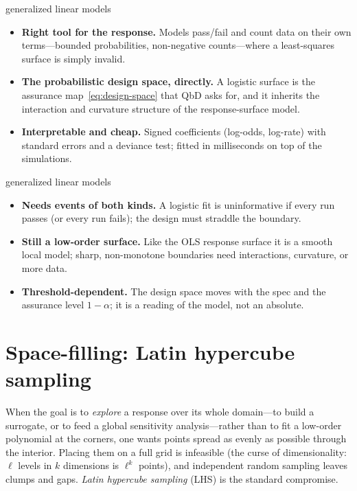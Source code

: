 \begin{prosbox}{generalized linear models}
\begin{itemize}
  \item \textbf{Right tool for the response.} Models pass/fail and count data on
  their own terms---bounded probabilities, non-negative counts---where a
  least-squares surface is simply invalid.
  \item \textbf{The probabilistic design space, directly.} A logistic surface is
  the assurance map~\eqref{eq:design-space} that QbD asks for, and it inherits the
  interaction and curvature structure of the response-surface model.
  \item \textbf{Interpretable and cheap.} Signed coefficients (log-odds, log-rate)
  with standard errors and a deviance test; fitted in milliseconds on top of the
  simulations.
\end{itemize}
\end{prosbox}

\begin{consbox}{generalized linear models}
\begin{itemize}
  \item \textbf{Needs events of both kinds.} A logistic fit is uninformative if
  every run passes (or every run fails); the design must straddle the boundary.
  \item \textbf{Still a low-order surface.} Like the OLS response surface it is a
  smooth local model; sharp, non-monotone boundaries need interactions, curvature,
  or more data.
  \item \textbf{Threshold-dependent.} The design space moves with the spec and the
  assurance level $1-\alpha$; it is a reading of the model, not an absolute.
\end{itemize}
\end{consbox}

\section{Space-filling: Latin hypercube sampling}
\label{sec:lhs}

When the goal is to \emph{explore} a response over its whole domain---to build a
surrogate, or to feed a global sensitivity analysis---rather than to fit a
low-order polynomial at the corners, one wants points spread as evenly as
possible through the interior. Placing them on a full grid is infeasible (the
curse of dimensionality: $\ell$ levels in $k$ dimensions is $\ell^k$ points), and
independent random sampling leaves clumps and gaps. \emph{Latin hypercube
sampling} (LHS) is the standard compromise.

